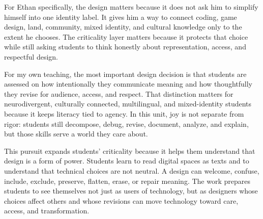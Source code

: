 \textcolor{LessonTwoAccent}{For Ethan specifically, the design matters because it does not ask him to simplify himself into one identity label. It gives him a way to connect coding, game design, land, community, mixed identity, and cultural knowledge only to the extent he chooses. The criticality layer matters because it protects that choice while still asking students to think honestly about representation, access, and respectful design.}

For my own teaching, the most important design decision is that students are assessed on how intentionally they communicate meaning and how thoughtfully they revise for audience, access, and respect. That distinction matters for neurodivergent, culturally connected, multilingual, and mixed-identity students because it keeps literacy tied to agency. In this unit, joy is not separate from rigor: students still decompose, debug, revise, document, analyze, and explain, but those skills serve a world they care about.

\textcolor{LessonTwoAccent}{This pursuit expands students' criticality because it helps them understand that design is a form of power. Students learn to read digital spaces as texts and to understand that technical choices are not neutral. A design can welcome, confuse, include, exclude, preserve, flatten, erase, or repair meaning. The work prepares students to see themselves not just as users of technology, but as designers whose choices affect others and whose revisions can move technology toward care, access, and transformation.}

\newpage
